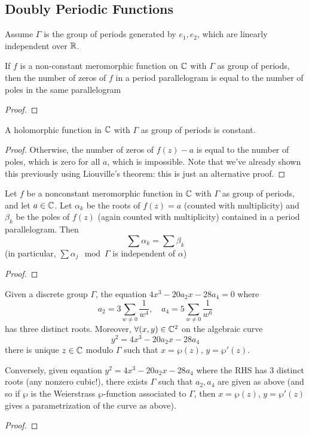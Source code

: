 \documentclass{article}
\begin{document}
\subsection{Doubly Periodic Functions}

Assume \(\Gamma\) is the group of periods generated by \(e_1, e_2\), which are linearly independent over \(\mathbb{R}\).
\begin{proposition}
If \(f\) is a non-constant meromorphic function on \(\mathbb{C}\) with \(\Gamma\) as group of periods, then the number of zeros of \(f\) in a period parallelogram is equal to the number of poles in the same parallelogram
\end{proposition}
\begin{proof}
\end{proof}
\begin{corollary}
A holomorphic function in \(\mathbb{C}\) with \(\Gamma\) as group of periods is constant.
\end{corollary}
\begin{proof}
Otherwise, the number of zeros of \(f(z) - a\) is equal to the number of poles, which is zero for all \(a\), which is impossible. Note that we've already shown this previously using Liouville's theorem: this is just an alternative proof.
\end{proof}
\begin{proposition}
Let \(f\) be a nonconstant meromorphic function in \(\mathbb{C}\) with \(\Gamma\) as group of periods, and let \(a \in \mathbb{C}\). Let \(\alpha_k\) be the roots of \(f(z) = a\) (counted with multiplicity) and \(\beta_k\) be the poles of \(f(z)\) (again counted with multiplicity) contained in a period parallelogram. Then
\begin{equation}\sum\alpha_k = \sum\beta_k\end{equation}
(in particular, \(\sum\alpha_j \mod \Gamma\) is independent of \(\alpha\))
\end{proposition}
\begin{proof}
\end{proof}
\begin{theorem}
Given a discrete group \(\Gamma\), the equation \(4x^3 - 20a_2x - 28a_4 = 0\) where
\begin{equation}a_2 = 3\sum_{w \neq 0}\frac{1}{w^4}, \quad a_4 = 5\sum_{w \neq 0}\frac{1}{w^6}\end{equation}
has three distinct roots. Moreover, \(\forall (x, y) \in \mathbb{C}^2\) on the algebraic curve
\begin{equation}y^2 = 4x^3 - 20a_2x - 28a_4\end{equation}
there is unique \(z \in \mathbb{C}\) modulo \(\Gamma\) such that \(x = \wp(z)\), \(y = \wp'(z)\).

Conversely, given equation \(y^2 = 4x^3 - 20a_2x - 28a_4\) where the RHS has 3 distinct roots (any nonzero cubic!), there exists \(\Gamma\) such that \(a_2, a_4\) are given as above (and so if \(\wp\) is the Weierstrass \(\wp\)-function associated to \(\Gamma\), then \(x = \wp(z)\), \(y = \wp'(z)\) gives a parametrization of the curve as above).
\end{theorem}
\begin{proof}
\end{proof}
\end{document}
